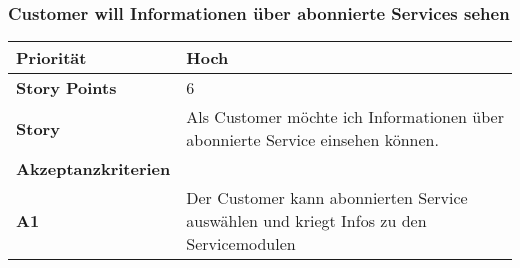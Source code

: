  \subsubsection{Customer will Informationen über abonnierte Services sehen}
\begin{tabularx}{\linewidth}{l X}
  \textbf{Priorität} & Hoch\\
  \hline
  \textbf{Story Points} & 6\\
  \hline
  \textbf{Story}& Als Customer möchte ich Informationen über abonnierte Service einsehen können.\\
  \hline
    \textbf{Akzeptanzkriterien} & \\
    \hline
  \textbf{A1} & Der Customer kann abonnierten Service auswählen und kriegt Infos zu den Servicemodulen\\
  \hline
 \end{tabularx}
 
